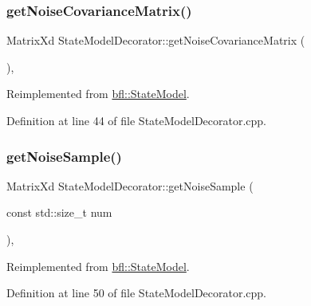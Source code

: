 \subsubsection{\texorpdfstring{get\+Noise\+Covariance\+Matrix()}{getNoiseCovarianceMatrix()}}
{\footnotesize\ttfamily Matrix\+Xd State\+Model\+Decorator\+::get\+Noise\+Covariance\+Matrix (\begin{DoxyParamCaption}{ }\end{DoxyParamCaption})\hspace{0.3cm}{\ttfamily [override]}, {\ttfamily [virtual]}}



Reimplemented from \mbox{\hyperlink{classbfl_1_1StateModel_a423c1fa86b9d60c8663dedc6cdcae276}{bfl\+::\+State\+Model}}.



Definition at line 44 of file State\+Model\+Decorator.\+cpp.

\mbox{\label{classbfl_1_1StateModelDecorator_a6825b807be82c66feb8bbb62d240490b}} 
\subsubsection{\texorpdfstring{get\+Noise\+Sample()}{getNoiseSample()}}
{\footnotesize\ttfamily Matrix\+Xd State\+Model\+Decorator\+::get\+Noise\+Sample (\begin{DoxyParamCaption}\item[{const std\+::size\+\_\+t}]{num }\end{DoxyParamCaption})\hspace{0.3cm}{\ttfamily [override]}, {\ttfamily [virtual]}}



Reimplemented from \mbox{\hyperlink{classbfl_1_1StateModel_acc6733af2dcba2a330bf7c59c3725e42}{bfl\+::\+State\+Model}}.



Definition at line 50 of file State\+Model\+Decorator.\+cpp.

\mbox{\label{classbfl_1_1StateModelDecorator_a2b2f00e6825e382587a2edbbba4569de}} 

